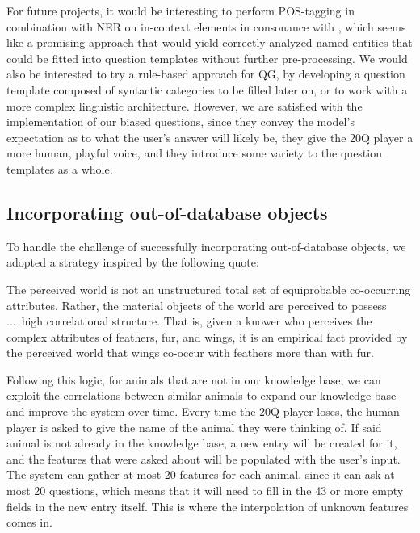 \documentclass[11pt,a4paper]{article}
\begin{document}
{For future projects, it would be interesting to perform POS-tagging in combination with NER on in-context elements in consonance with \citet{Mandasari2019}, which seems like a promising approach that would yield correctly-analyzed named entities that could be fitted into question templates without further pre-processing. We would also be interested to try a rule-based approach for QG, by developing a question template composed of syntactic categories to be filled later on, or to work with a more complex linguistic architecture. However, we are satisfied with the implementation of our biased questions, since they convey the model's expectation as to what the user's answer will likely be, they give the 20Q player a more human, playful voice, and they introduce some variety to the question templates as a whole.

\subsection{Incorporating out-of-database objects}
\label{subsec:out-of-db}

To handle the challenge of successfully incorporating out-of-database objects, we adopted a strategy inspired by the following quote:

\begin{displayquote}
The perceived world is not an unstructured total set of equiprobable co-occurring attributes. Rather, the material objects of the world are perceived to possess ...\ high correlational structure.
That is, given a knower who perceives the complex attributes of feathers, fur, and wings, it is an empirical fact provided by the perceived world that wings co-occur with feathers more than with fur. \citep[29]{Rosch1978}
\end{displayquote}

Following this logic, for animals that are not in our knowledge base, we can exploit the correlations between similar animals to expand our knowledge base and improve the system over time.
Every time the 20Q player loses, the human player is asked to give the name of the animal they were thinking of. 
If said animal is not already in the knowledge base, a new entry will be created for it, and the features that were asked about will be populated with the user's input. 
The system can gather at most 20 features for each animal, since it can ask at most 20 questions, which means that it will need to fill in the 43 or more empty fields in the new entry itself.
This is where the interpolation of unknown features comes in.

}
\end{document}
